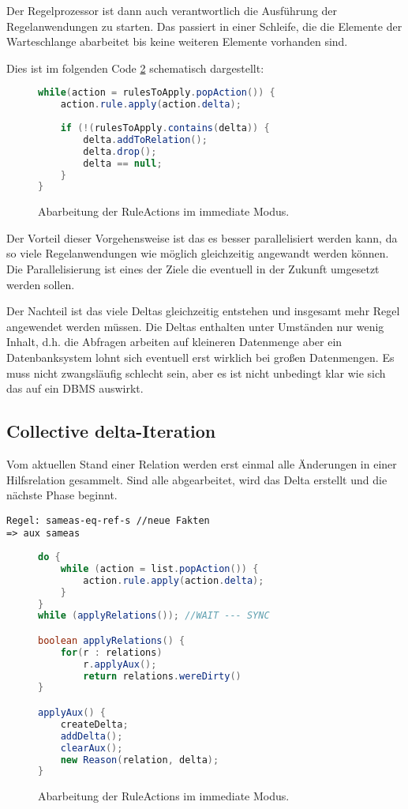 Der Regelprozessor ist dann auch verantwortlich die Ausführung der Regelanwendungen zu starten. Das passiert in einer Schleife, die die Elemente der Warteschlange abarbeitet bis keine weiteren Elemente vorhanden sind.

Dies ist im folgenden Code \ref{code-immediate-delta-iteration} schematisch dargestellt:

\begin{figure}[htp]
	\caption{Abarbeitung der RuleActions im immediate Modus.}
	\label{code-immediate-delta-iteration}
	\begin{lstlisting}[language=Java]
while(action = rulesToApply.popAction()) {
	action.rule.apply(action.delta);
	
	if (!(rulesToApply.contains(delta)) {
		delta.addToRelation();
		delta.drop();
		delta == null;
	}
}
	\end{lstlisting}
\end{figure}


Der Vorteil dieser Vorgehensweise ist das es besser parallelisiert werden kann, da so viele Regelanwendungen wie möglich gleichzeitig angewandt werden können. Die Parallelisierung ist eines der Ziele die eventuell in der Zukunft umgesetzt werden sollen.

Der Nachteil ist das viele Deltas gleichzeitig entstehen und insgesamt mehr Regel angewendet werden müssen. Die Deltas enthalten unter Umständen nur wenig Inhalt, d.h. die Abfragen arbeiten auf kleineren Datenmenge aber ein Datenbanksystem lohnt sich eventuell erst wirklich bei großen Datenmengen. Es muss nicht zwangsläufig schlecht sein, aber es ist nicht unbedingt klar wie sich das auf ein DBMS auswirkt.

\subsection{Collective delta-Iteration}

Vom aktuellen Stand einer Relation werden erst einmal alle Änderungen in einer Hilfsrelation gesammelt. Sind alle abgearbeitet, wird das Delta erstellt und die nächste Phase beginnt.

\begin{verbatim}
Regel: sameas-eq-ref-s //neue Fakten
=> aux sameas
\end{verbatim}

\begin{figure}[htp]
	\caption{Abarbeitung der RuleActions im immediate Modus.}
	\label{code-immediate-delta-iteration}
	\begin{lstlisting}[language=Java]
do {
	while (action = list.popAction()) {
		action.rule.apply(action.delta);
	}
}
while (applyRelations()); //WAIT --- SYNC

boolean applyRelations() {
	for(r : relations)
		r.applyAux();
		return relations.wereDirty()
}

applyAux() {
	createDelta;
	addDelta();
	clearAux();
	new Reason(relation, delta);
}
	\end{lstlisting}
\end{figure}

